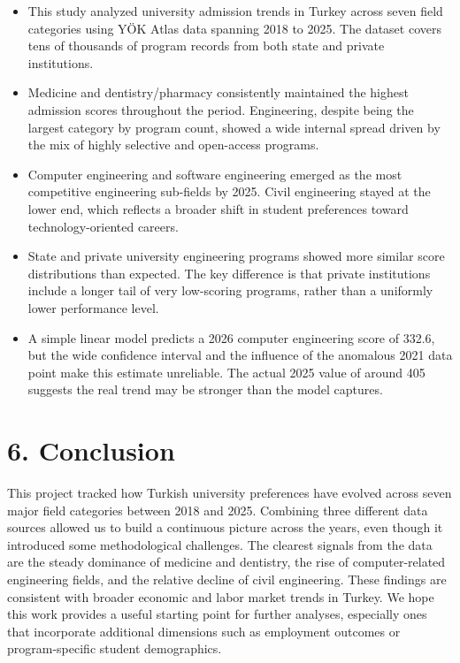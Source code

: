 \documentclass[
  11pt,
  a4paper,
  DIV=11,
  numbers=noendperiod]{scrartcl}
\providecommand{\tightlist}{%
  \setlength{\itemsep}{0pt}\setlength{\parskip}{0pt}}
\begin{document}
\begin{itemize}
\tightlist
\item
  This study analyzed university admission trends in Turkey across seven
  field categories using YÖK Atlas data spanning 2018 to 2025. The
  dataset covers tens of thousands of program records from both state
  and private institutions.
\item
  Medicine and dentistry/pharmacy consistently maintained the highest
  admission scores throughout the period. Engineering, despite being the
  largest category by program count, showed a wide internal spread
  driven by the mix of highly selective and open-access programs.
\item
  Computer engineering and software engineering emerged as the most
  competitive engineering sub-fields by 2025. Civil engineering stayed
  at the lower end, which reflects a broader shift in student
  preferences toward technology-oriented careers.
\item
  State and private university engineering programs showed more similar
  score distributions than expected. The key difference is that private
  institutions include a longer tail of very low-scoring programs,
  rather than a uniformly lower performance level.
\item
  A simple linear model predicts a 2026 computer engineering score of
  332.6, but the wide confidence interval and the influence of the
  anomalous 2021 data point make this estimate unreliable. The actual
  2025 value of around 405 suggests the real trend may be stronger than
  the model captures.
\end{itemize}

\section{6. Conclusion}\label{conclusion}

This project tracked how Turkish university preferences have evolved
across seven major field categories between 2018 and 2025. Combining
three different data sources allowed us to build a continuous picture
across the years, even though it introduced some methodological
challenges. The clearest signals from the data are the steady dominance
of medicine and dentistry, the rise of computer-related engineering
fields, and the relative decline of civil engineering. These findings
are consistent with broader economic and labor market trends in Turkey.
We hope this work provides a useful starting point for further analyses,
especially ones that incorporate additional dimensions such as
employment outcomes or program-specific student demographics.
\end{document}
